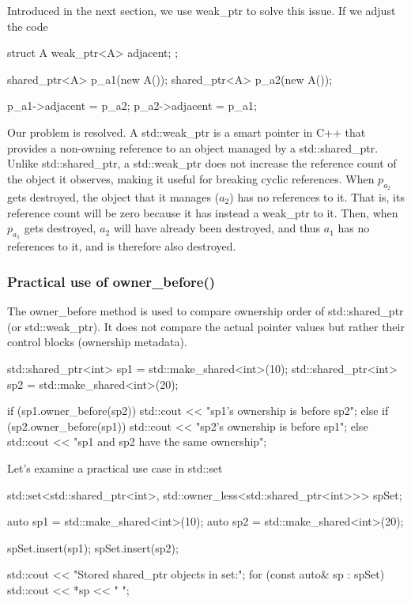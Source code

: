 \documentclass{report}
\begin{document}
Introduced in the next section, we use weak\_ptr to solve this issue. If we adjust the code
\bigbreak \noindent 
\begin{cppcode}
struct A {
    weak_ptr<A> adjacent;
};

shared_ptr<A> p_a1(new A());
shared_ptr<A> p_a2(new A());

p_a1->adjacent = p_a2;
p_a2->adjacent = p_a1;
\end{cppcode}
\bigbreak \noindent 
Our problem is resolved. A std::weak\_ptr is a smart pointer in C++ that provides a non-owning reference to an object managed by a std::shared\_ptr. Unlike std::shared\_ptr, a std::weak\_ptr does not increase the reference count of the object it observes, making it useful for breaking cyclic references.
\bigbreak \noindent 
When $p_{a_2}$ gets destroyed, the object that it manages ($a_2$) has no references to it. That is, its reference count will be zero because it has instead a weak\_ptr to it. Then, when $p_{a_1}$ gets destroyed, $a_2$ will have already been destroyed, and thus $a_1$ has no references to it, and is therefore also destroyed.

\bigbreak \noindent 
\subsubsection{Practical use of owner\_before()}
\bigbreak \noindent 
The owner\_before method is used to compare ownership order of std::shared\_ptr (or std::weak\_ptr). It does not compare the actual pointer values but rather their control blocks (ownership metadata).
\bigbreak \noindent 
\begin{cppcode}
    std::shared_ptr<int> sp1 = std::make_shared<int>(10);
    std::shared_ptr<int> sp2 = std::make_shared<int>(20);

    if (sp1.owner_before(sp2)) {
        std::cout << "sp1's ownership is before sp2\n";
    } else if (sp2.owner_before(sp1)) {
        std::cout << "sp2's ownership is before sp1\n";
    } else {
        std::cout << "sp1 and sp2 have the same ownership\n";
    }
\end{cppcode}
\bigbreak \noindent 
Let's examine a practical use case in std::set
\bigbreak \noindent 
\begin{cppcode}
    std::set<std::shared_ptr<int>, std::owner_less<std::shared_ptr<int>>> spSet;

    auto sp1 = std::make_shared<int>(10);
    auto sp2 = std::make_shared<int>(20);

    spSet.insert(sp1);
    spSet.insert(sp2);

    std::cout << "Stored shared_ptr objects in set:\n";
    for (const auto& sp : spSet) {
        std::cout << *sp << " ";
    }
\end{cppcode}
\end{document}
